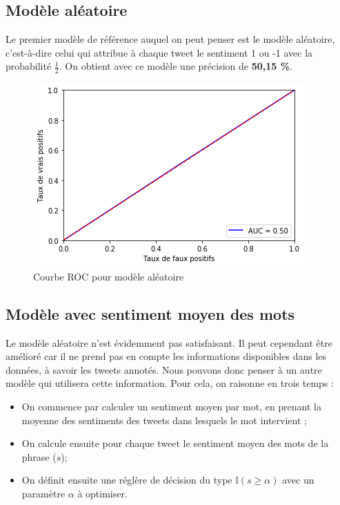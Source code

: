 \documentclass[11pt,french,french]{article}
\begin{document}
\subsection{Modèle aléatoire}\label{moduxe8le-aluxe9atoire}

Le premier modèle de référence auquel on peut penser est le modèle
aléatoire, c'est-à-dire celui qui attribue à chaque tweet le sentiment 1
ou -1 avec la probabilité \(\frac{1}{2}\). On obtient avec ce modèle une
précision de \textbf{50,15 \%}.

\begin{figure}
\centering
\includegraphics{img/roc_random.png}
\caption{Courbe ROC pour modèle aléatoire}
\end{figure}

\subsection{Modèle avec sentiment moyen des
mots}\label{moduxe8le-avec-sentiment-moyen-des-mots}

Le modèle aléatoire n'est évidemment pas satisfaisant. Il peut cependant
être amélioré car il ne prend pas en compte les informations disponibles
dans les données, à savoir les tweets annotés. Nous pouvons donc penser
à un autre modèle qui utilisera cette information. Pour cela, on
raisonne en trois temps :

\begin{itemize}
\item On commence par calculer un sentiment moyen par mot, en prenant la moyenne des sentiments des tweets dans lesquels le mot intervient ;
\item On calcule ensuite pour chaque tweet le sentiment moyen des mots de la phrase ($s$);
\item On définit ensuite une réglère de décision du type $\mathbb{I}(s \geq \alpha)$ avec un paramètre $\alpha$ à optimiser.
\end{itemize}
\end{document}
